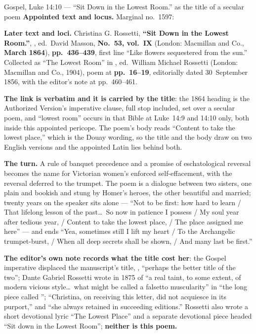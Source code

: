 \begin{afterlife}{Gospel, Luke 14:10 --- ``Sit Down in the Lowest Room.'' as the title of a secular poem}
\textbf{Appointed text and locus.} Marginal no.~1597: 

\textbf{Later text and loci.} Christina G. Rossetti, \textbf{``Sit Down in the
Lowest Room.''}, , ed.\ David Masson, \textbf{No.~53,
vol.~IX} (London: Macmillan and Co., \textbf{March 1864}), \textbf{pp.~436--439},
first line ``Like flowers sequestered from the sun.'' Collected as ``The Lowest
Room'' in , ed.\ William
Michael Rossetti (London: Macmillan and Co., 1904), poem at \textbf{pp.~16--19},
editorially dated 30~September 1856, with the editor's note at pp.~460--461.

\textbf{The link is verbatim and it is carried by the title}: the 1864 heading is
the Authorized Version's imperative clause, full stop included, set over a
secular poem, and ``lowest room'' occurs in that Bible at Luke~14:9 and 14:10
only, both inside this appointed pericope. The poem's body reads ``Content to
take the lowest place,'' which is the Douay wording, so the title and the body
draw on two English versions and the appointed Latin lies behind both.

\textbf{The turn.} A rule of banquet precedence and a promise of eschatological
reversal becomes the name for Victorian women's enforced self-effacement, with
the reversal deferred to the trumpet. The poem is a dialogue between two
sisters, one plain and bookish and stung by Homer's heroes, the other beautiful
and married; twenty years on the speaker sits alone --- ``Not to be first: how
hard to learn / That lifelong lesson of the past\dots\ So now in patience I
possess / My soul year after tedious year, / Content to take the lowest place, /
The place assigned me here'' --- and ends ``Yea, sometimes still I lift my heart
/ To the Archangelic trumpet-burst, / When all deep secrets shall be shown, /
And many last be first.''

\textbf{The editor's own note records what the title cost her}: the Gospel
imperative displaced the manuscript's title,
, ``perhaps the better title of the two'';
Dante Gabriel Rossetti wrote in 1875 of ``a real taint, to some extent, of
modern vicious style\dots\ what might be called a falsetto muscularity'' in
``the long piece called ''; ``Christina, on receiving this
letter, did not acquiesce in its purport,'' and ``she always retained  in succeeding editions.'' Rossetti also wrote a short devotional
lyric ``The Lowest Place'' and a separate devotional piece headed ``Sit down in
the Lowest Room''; \textbf{neither is this poem.}
\end{afterlife}

